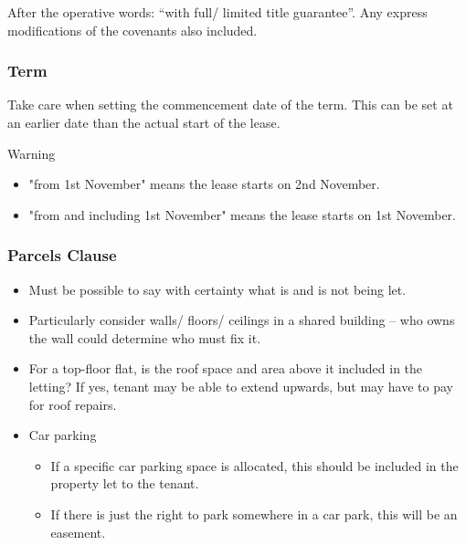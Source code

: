 \documentclass[
]{article}
\providecommand{\tightlist}{%
  \setlength{\itemsep}{0pt}\setlength{\parskip}{0pt}}
\newenvironment{env-1183acc6-7dc8-44d4-a985-6dec306e67fd}
{
    \savenotes\tcolorbox[blanker,breakable,left=5pt,borderline west={2pt}{-4pt}{orange}]
}
{
    \endtcolorbox\spewnotes
}
\begin{document}
After the operative words: ``with full/ limited title guarantee''. Any
express modifications of the covenants also included.

\hypertarget{term}{%
\subsubsection{Term}\label{term}}

Take care when setting the commencement date of the term. This can be
set at an earlier date than the actual start of the lease.

\begin{env-1183acc6-7dc8-44d4-a985-6dec306e67fd}

Warning

\begin{itemize}
\tightlist
\item
  "from 1st November" means the lease starts on 2nd November.
\item
  "from and including 1st November" means the lease starts on 1st
  November.
\end{itemize}

\end{env-1183acc6-7dc8-44d4-a985-6dec306e67fd}

\hypertarget{parcels-clause}{%
\subsubsection{Parcels Clause}\label{parcels-clause}}

\begin{itemize}
\tightlist
\item
  Must be possible to say with certainty what is and is not being let.
\item
  Particularly consider walls/ floors/ ceilings in a shared building --
  who owns the wall could determine who must fix it.
\item
  For a top-floor flat, is the roof space and area above it included in
  the letting? If yes, tenant may be able to extend upwards, but may
  have to pay for roof repairs.
\item
  Car parking

  \begin{itemize}
  \tightlist
  \item
    If a specific car parking space is allocated, this should be
    included in the property let to the tenant.
  \item
    If there is just the right to park somewhere in a car park, this
    will be an easement.
  \end{itemize}
\end{itemize}
\end{document}
